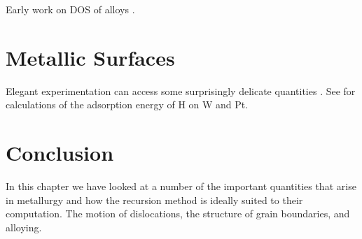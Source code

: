 Early work on DOS of alloys \cite{cubiotti77}. 

\section{Metallic Surfaces}
Elegant experimentation can access some surprisingly delicate quantities \cite{whipp34}.
See \cite{bullet77} for calculations of the adsorption energy of H on W and Pt.

\section{Conclusion}
In this chapter we have looked at a number of the important quantities that
arise in metallurgy and how the recursion method is ideally suited to their 
computation. The motion of dislocations, the structure of grain boundaries, 
and alloying. 

